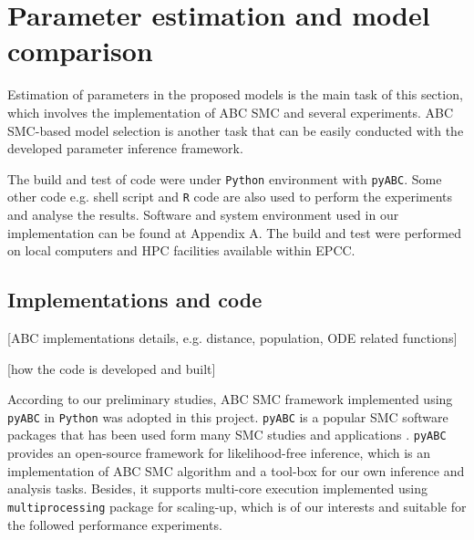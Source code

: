 \documentclass[12pt,a4paper]{report}
\begin{document}










\chapter{Parameter estimation and model comparison}

Estimation of  parameters in the proposed models is the main task of this section, which involves the implementation of ABC SMC and several experiments. ABC SMC-based model selection is another task that can be easily conducted with the developed parameter inference framework.

The build and test of code were under \verb|Python| environment with \verb|pyABC|\cite{ref:pyabc}. Some other code e.g. shell script and \verb|R| code are also used to perform the experiments and analyse the results. Software and system environment used in our implementation can be found at Appendix A. The build and test were performed on local computers and HPC facilities available within EPCC.






\section{Implementations and code}

 [ABC implementations details, e.g. distance, population, ODE related functions]

 [how the code is developed and built]

According to our preliminary studies, ABC SMC framework implemented using \verb|pyABC| in \verb|Python| was adopted in this project. \verb|pyABC| is a popular SMC software packages \cite{ref:pyabc} that has been used form many SMC studies and applications \cite{ref:adpt_pop}. \verb|pyABC| provides an open-source framework for likelihood-free inference, which is an implementation of ABC SMC algorithm and a tool-box for our own inference and analysis tasks. Besides, it supports multi-core execution implemented using \verb|multiprocessing| package for scaling-up, which is of our interests and suitable for the followed performance experiments.
\end{document}
